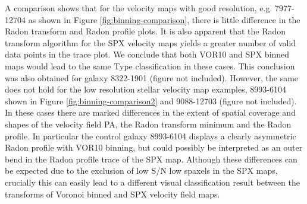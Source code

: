 A comparison shows that for the velocity maps with good resolution, e.g. 7977-12704 as shown in Figure \ref{fig:binning-comparison},  there is little difference in the Radon transform and Radon profile plots. It is also apparent that the Radon transform algorithm for the SPX velocity maps yields a greater number of valid data points in the trace plot. We conclude that both VOR10 and SPX binned maps would lead to the same Type classification in these cases. This conclusion was also obtained for galaxy 8322-1901 (figure not included).  However, the same does not hold for the low resolution stellar velocity map examples, 8993-6104 shown in Figure \ref{fig:binning-comparison2} and 9088-12703 (figure not included). In these cases there are marked differences in the extent of spatial coverage and shapes of the velocity field PA, the Radon transform minimum and the Radon profile. In particular the control galaxy 8993-6104 displays a clearly asymmetric Radon profile with VOR10 binning, but could possibly be interpreted as an outer bend in the Radon profile trace of the SPX map. Although these differences can be expected due to the exclusion of low S/N low spaxels in the SPX maps, crucially this can easily lead to a different visual classification result between the transforms of Voronoi binned and SPX velocity field maps.    